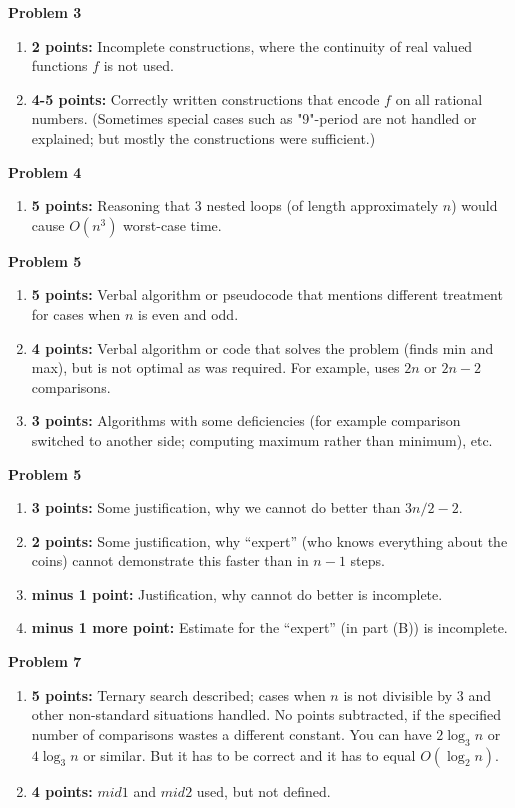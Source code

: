 \documentclass[jou]{apa6}
\begin{document}
\vspace{2ex}
{\bf Problem 3} 
\begin{enumerate}
\item {\bf 2 points:} Incomplete constructions, where the continuity of real valued functions $f$ is not used. 
\item {\bf 4-5 points:} Correctly written constructions that encode $f$ on all rational numbers. (Sometimes 
special cases such as "9"-period are not handled or explained; but mostly the constructions were sufficient.)
\end{enumerate}


\vspace{2ex}
{\bf Problem 4} 
\begin{enumerate}
\item {\bf 5 points:} Reasoning that 3 nested loops (of length approximately $n$) would 
cause $O(n^3)$ worst-case time.
\end{enumerate}


\vspace{2ex}
{\bf Problem 5} 
\begin{enumerate}
\item {\bf 5 points:} Verbal algorithm or pseudocode that mentions different treatment for cases when $n$ is even and odd.
\item {\bf 4 points:} Verbal algorithm or code that solves the problem (finds min and max), but is not optimal as was required. 
For example, uses $2n$ or $2n-2$ comparisons.
\item {\bf 3 points:} Algorithms with some deficiencies (for example comparison switched to another side; computing maximum rather than minimum), etc. 
\end{enumerate}


\vspace{2ex}
{\bf Problem 5} 
\begin{enumerate}
\item {\bf 3 points:} Some justification, why we cannot do better than $3n/2-2$. 
\item {\bf 2 points:} Some justification, why ``expert'' (who knows everything about the coins) cannot demonstrate this faster than in $n-1$ steps.
\item {\bf minus 1 point:} Justification, why cannot do better is incomplete.
\item {\bf minus 1 more point:} Estimate for the ``expert'' (in part (B)) is incomplete.
\end{enumerate}




\vspace{2ex}
{\bf Problem 7} 
\begin{enumerate} 
\item {\bf 5 points:} Ternary search described; cases when $n$ is not divisible by $3$ and other non-standard
situations handled. No points subtracted, if the specified number of comparisons wastes a different constant. 
You can have $2\log_3 n$ or $4\log_3 n$ or similar. But it has to be correct and it has to 
equal $O(\log_2 n)$. 
\item {\bf 4 points:} $mid1$ and $mid2$ used, but not defined.
\end{enumerate}
\end{document}
